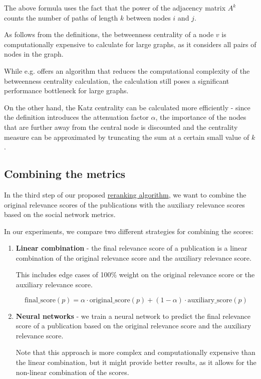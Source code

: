 The above formula uses the fact that the power of the adjacency matrix $A^k$ counts the number of paths of length $k$ between nodes $i$ and $j$.

\begin{mybox}{}
As follows from the definitions, the betweenness centrality of a node $v$ is computationally expensive 
to calculate for large graphs, as it considers all pairs of nodes in the graph.

While e.g. \cite{brandes-faster-centrality} offers an algorithm that reduces the computational complexity of the betweenness centrality calculation,
the calculation still poses a significant performance bottleneck for large graphs.

\label{katz-faster}
On the other hand, the Katz centrality can be calculated more efficiently - since the definition introduces 
the attenuation factor $\alpha$, the importance of the nodes that are further away from the central node is discounted
and the centrality measure can be approximated by truncating the sum at a certain small value of $k$.
\end{mybox}

\subsection{Combining the metrics}\label{combining-metrics}

In the third step of our proposed \hyperref[reranking-algorithm]{reranking algorithm},
we want to combine the original relevance scores of the publications with the auxiliary 
relevance scores based on the social network metrics.

In our experiments, we compare two different strategies for combining the scores:

\begin{enumerate}
    \item \textbf{Linear combination} - the final relevance score of a publication is a linear combination of the original relevance score and the auxiliary relevance score. 
    
    This includes edge cases of 100\% weight on the original relevance score or the auxiliary relevance score.

    $$
    \text{final\_score}(p) = \alpha \cdot \text{original\_score}(p) + (1 - \alpha) \cdot \text{auxiliary\_score}(p)
    $$
    \item \textbf{Neural networks} - we train a neural network to predict the final relevance score of a publication based on the original relevance score and the auxiliary relevance score.
    
    Note that this approach is more complex and computationally expensive than the linear combination, but it might provide better results,
    as it allows for the non-linear combination of the scores.
\end{enumerate}
    
